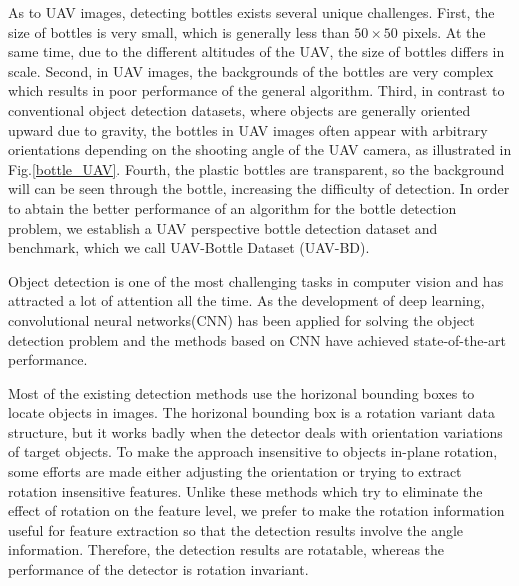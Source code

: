 
As to UAV images, detecting bottles exists several unique challenges. First, the size of bottles is very small, which is generally less than $ 50\times 50 $ pixels. At the same time, due to the different altitudes of the UAV, the size of bottles differs in scale. Second, in UAV images, the backgrounds of the bottles are very complex which results in poor performance of the general algorithm. Third, in contrast to conventional object detection datasets, where objects are generally oriented upward due to gravity\cite{DOTA}, the bottles in UAV images often appear with arbitrary orientations depending on the shooting angle of the UAV camera, as illustrated in Fig.\ref{bottle_UAV}. Fourth, the plastic bottles are transparent, so the background will can be seen through the bottle, increasing the difficulty of detection. In order to abtain the better performance of an algorithm for the bottle detection problem, we establish a UAV perspective bottle detection dataset and benchmark, which we call UAV-Bottle Dataset (UAV-BD).

Object detection is one of the most challenging tasks in computer vision and has attracted a lot of attention all the time\cite{DRBox}. As the development of deep learning, convolutional neural networks(CNN) has been applied for solving the object detection problem and the methods based on CNN have achieved state-of-the-art performance\cite{DRBox}. 

Most of the existing detection methods use the horizonal bounding boxes to locate objects in images. The horizonal bounding box is a rotation variant data structure, but it works badly when the detector deals with orientation variations of target objects. To make the approach insensitive to objects in-plane rotation, some efforts are made either adjusting the orientation or trying to extract rotation insensitive features. Unlike these methods which try to eliminate the effect of rotation on the feature level, we prefer to make the rotation information useful for feature extraction so that the detection results involve the angle information. Therefore, the detection results are rotatable, whereas the performance of the detector is rotation invariant\cite{DRBox}.